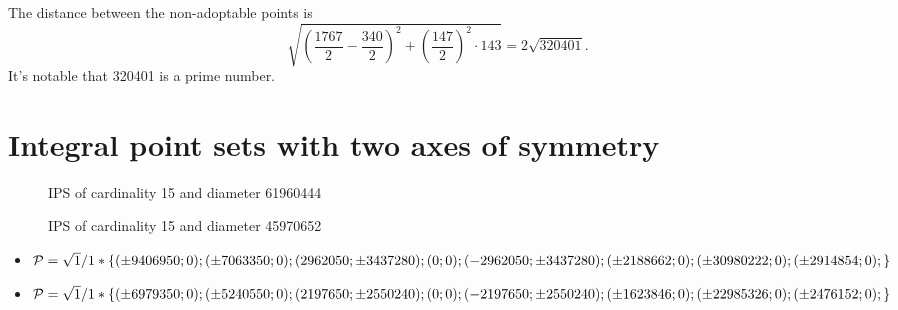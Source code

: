 \documentclass[12pt]{article}
\theoremstyle{theorem}
\theoremstyle{dfn}
\theoremstyle{remark}
\begin{document}
The distance between the non-adoptable points is
\begin{equation}
	\sqrt{\left(\frac{1767}{2} - \frac{340}{2}\right)^2 + \left(\frac{147}{2}\right)^2\cdot143} = 2\sqrt{320401}
	.
\end{equation}
It's notable that 320401 is a prime number.

\section{Integral point sets with two axes of symmetry}

\begin{figure}[h!]
\parbox{1\linewidth}{\caption{IPS of cardinality 15 and diameter 61960444}
\label{15_61960444_1.png}}
\end{figure}

\begin{figure}[h!]
\parbox{1\linewidth}{\caption{IPS of cardinality 15 and diameter 45970652}
\label{15_45970652_1.png}}
\end{figure}

\begin{itemize}
\item
$\mathcal{P}=\sqrt{1}/1*\{
( \pm9406950 ; 0);
( \pm7063350 ; 0);
( 2962050 ; \pm3437280);
( 0 ; 0);
( -2962050 ; \pm3437280);\\
( \pm2188662 ; 0);
( \pm30980222 ; 0);
( \pm2914854 ; 0);
\}$

\item
$\mathcal{P}=\sqrt{1}/1*\{
( \pm6979350 ; 0);
( \pm5240550 ; 0);
( 2197650 ; \pm2550240);
( 0 ; 0);
( -2197650 ; \pm2550240);\\
( \pm1623846 ; 0);
( \pm22985326 ; 0);
( \pm2476152 ; 0);
\}$
\end{itemize}





\end{document}
